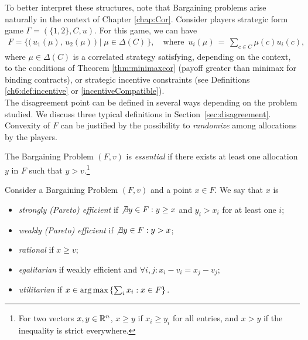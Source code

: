 \vspace{3cm}
To better interpret these structures, note that Bargaining problems arise naturally in the context of Chapter \ref{chap:Cor}.
Consider players strategic form game $\Gamma = (\{1,2\}, C, u)$.
For this game, we can have
\begin{align*}
	F = \Big\{ \big( \, u_1(\mu), \, u_2(\mu) \, \big) \; | \; \mu \in \Delta(C) \, \Big\}, \quad \text{where } \, u_i(\mu) \, = \, \sum_{c \in C} \mu(c) u_i(c),
\end{align*}
where $\mu \in \Delta(C)$ is a correlated strategy satisfying, depending on the context, to the conditions of Theorem \ref{thm:minimaxcor} (payoff greater than minimax for binding contracts), or strategic incentive constraints (see Definitions \ref{ch6:def:incentive} or \ref{incentiveCompatible}).\\
The disagreement point can be defined in several ways depending on the problem studied. We discuss three typical definitions in Section~\ref{sec:disagreement}.\\
Convexity of $F$ can be justified by the possibility to \emph{randomize} among allocations by the players.

\begin{definition}[Essential]
The Bargaining Problem $(F, v)$ is \emph{essential} if there exists at least one allocation $y$ in $F$ such that $y > v$.\footnote{For two vectors $x,y \in \mathbb{R}^n$, $x \geq y$ if $x_i \geq y_i$ for all entries, and $x > y$ if the inequality is strict everywhere.}
\end{definition}
 \vspace{2cm}

\begin{definition}
Consider a Bargaining Problem $(F, v)$ and a point $x \in F$. We say that $x$ is
\begin{itemize}
\item \emph{strongly (Pareto) efficient} if $\not \exists y \in F: y \geq x$ and $y_i > x_i$ for at least one $i$;
\item \emph{weakly (Pareto) efficient} if $\not \exists y \in F: y > x$;
\item \emph{rational} if $x \geq v$;
\item \emph{egalitarian} if weakly efficient and $\forall i,j: x_i-v_i = x_j-v_j$;
\item \emph{utilitarian} if
$x \in \operatorname*{arg\,max} \left \{ \sum_i x_i : x \in F \right \}.$
\end{itemize}
\label{defEffiEgalUti}
\end{definition}

